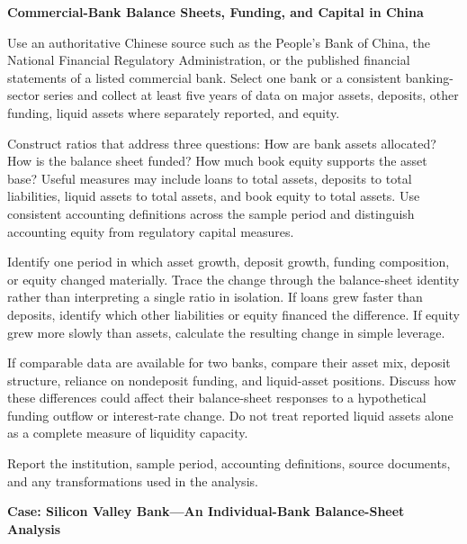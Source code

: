 

\textbf{Commercial-Bank Balance Sheets, Funding, and Capital in China}

Use an authoritative Chinese source such as the People's Bank of China,
the National Financial Regulatory Administration, or the published financial
statements of a listed commercial bank. Select one bank or a consistent
banking-sector series and collect at least five years of data on major assets,
deposits, other funding, liquid assets where separately reported, and equity.

Construct ratios that address three questions: How are bank assets allocated?
How is the balance sheet funded? How much book equity supports the asset base?
Useful measures may include loans to total assets, deposits to total liabilities,
liquid assets to total assets, and book equity to total assets. Use consistent
accounting definitions across the sample period and distinguish accounting
equity from regulatory capital measures.

Identify one period in which asset growth, deposit growth, funding composition,
or equity changed materially. Trace the change through the balance-sheet
identity rather than interpreting a single ratio in isolation. If loans grew
faster than deposits, identify which other liabilities or equity financed the
difference. If equity grew more slowly than assets, calculate the resulting
change in simple leverage.

If comparable data are available for two banks, compare their asset mix,
deposit structure, reliance on nondeposit funding, and liquid-asset positions.
Discuss how these differences could affect their balance-sheet responses to a
hypothetical funding outflow or interest-rate change. Do not treat reported
liquid assets alone as a complete measure of liquidity capacity.

Report the institution, sample period, accounting definitions, source documents,
and any transformations used in the analysis.



\textbf{Case: Silicon Valley Bank---An Individual-Bank Balance-Sheet Analysis}

